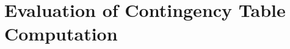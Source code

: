 \documentclass{acm_proc_article-sp}
\begin{document}


\section{Evaluation of Contingency Table Computation} 
\end{document}
